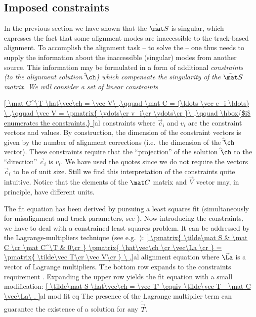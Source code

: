 \subsection[al constr]{Imposed constraints}

In the previous section we have shown that the $\tilde\mat S$ is singular, which expresses the fact that some alignment modes are inaccessible to the track-based alignment. To accomplish the alignment task -- to solve the  -- one thus needs to supply the information about the inaccessible (singular) modes from another source. This information may be formulated in a form of additional \em{constraints} (to the alignment solution $\hat\vec\ch$) which compensate the singularity of the $\tilde\mat S$ matrix. We will consider a set of linear constraints

\eqref{
	\mat C^\T \hat\vec\ch = \vec V\ ,\qquad
	\mat C = (\ldots \vec c_i \ldots) \ ,\qquad
	\vec V = \pmatrix{
		\vdots\cr
		v_i\cr
		\vdots\cr
	}\ ,\qquad
	\hbox{$i$ enumerates the constraints,}
}{al constraints}
where $\vec c_i$ and $v_i$ are the constraint vectors and values. By construction, the dimension of the constraint vectors is given by the number of alignment corrections (i.e.~the dimension of the $\hat\vec\ch$ vector). These constraints require that the ``projection'' of the solution $\hat\vec\ch$ to the ``direction'' $\vec c_i$ is $v_i$. We have used the quotes since we do not require the vectors $\vec c_i$ to be of unit size. Still we find this interpretation of the constraints quite intuitive. Notice that the elements of the $\mat C$ matrix and $\vec V$ vector may, in principle, have different units.

The fit equation  has been derived by pursuing a least squares fit (simultaneously for misalignment and track parameters, see ). Now introducing the constraints, we have to deal with a constrained least squares problem. It can be addressed by the Lagrange-multipliers technique (see e.g.~):
\eqref{
	\pmatrix{
		\tilde\mat S & \mat C \cr
		\mat C^\T & 0\cr
	}
	\pmatrix{
		\hat\vec\ch \cr
		\vec\La \cr
	}
	=
	\pmatrix{
		\tilde\vec T\cr
		\vec V\cr
	}
\ ,}{al alignment equation}
where $\vec\La$ is a vector of Lagrange multipliers. The bottom row expands to the constraints requirement . Expanding the upper row yields the fit equation  with a small modification:
\eqref{
	\tilde\mat S \hat\vec\ch = \vec T' \equiv \tilde\vec T - \mat C \vec\La\ .
}{al mod fit eq}
The presence of the Lagrange multiplier term can guarantee the existence of a solution for any $\tilde\vec T$.

